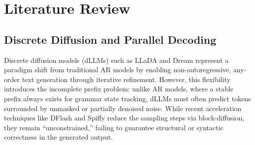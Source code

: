 


\section{Literature Review}

\subsection{Discrete Diffusion and Parallel Decoding}
Discrete diffusion models (dLLMs) such as LLaDA \citep{llada} and Dream \citep{dream} represent a paradigm shift from traditional AR models by enabling non-autoregressive, any-order text generation through iterative refinement. However, this flexibility introduces the incomplete prefix problem: unlike AR models, where a stable prefix always exists for grammar state tracking, dLLMs must often predict tokens surrounded by unmasked or partially denoised noise. While recent acceleration techniques like DFlash \citep{chen2026dflashblockdiffusionflash} and Spiffy \citep{agrawal2026spiffymultiplyingdiffusionllm} reduce the sampling steps via block-diffusion, they remain ``unconstrained,'' failing to guarantee structural or syntactic correctness in the generated output.

